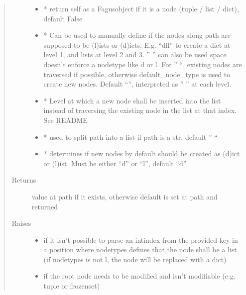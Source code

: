 \documentclass[a4paper,10pt,english]{sphinxmanual}
\begin{document}
\begin{fulllineitems}
\begin{fulllineitems}
\begin{quote}
\begin{description}
\begin{itemize}
\item {}
\sphinxAtStartPar
{} \textendash{} * return self as a Fagus\sphinxhyphen{}object if it is a node (tuple / list / dict), default False

\item {}
\sphinxAtStartPar
{} \textendash{} * Can be used to manually define if the nodes along path are supposed to be (l)ists or
(d)icts. E.g. “dll” to create a dict at level 1, and lists at level 2 and 3. ” ” can also be used \sphinxhyphen{}
space doesn’t enforce a node\sphinxhyphen{}type like d or l. For ” “, existing nodes are traversed if possible,
otherwise default\_node\_type is used to create new nodes. Default “”, interpreted as ” ” at each level.

\item {}
\sphinxAtStartPar
{} \textendash{} * Level at which a new node shall be inserted into the list instead of traversing the
existing node in the list at that index. See README

\item {}
\sphinxAtStartPar
{} \textendash{} * used to split path into a list if path is a str, default ” “

\item {}
\sphinxAtStartPar
{} \textendash{} * determines if new nodes by default should be created as (d)ict or (l)ist. Must be
either “d” or “l”, default “d”

\end{itemize}

\item[{Returns}] \leavevmode
\sphinxAtStartPar
value at path if it exists, otherwise default is set at path and returned

\item[{Raises}] \leavevmode\begin{itemize}
\item {}
\sphinxAtStartPar
{} \textendash{} if it isn’t possible to parse an int\sphinxhyphen{}index from the provided key in a position where node\sphinxhyphen{}types
    defines that the node shall be a list (if node\sphinxhyphen{}types is not l, the node will be replaced with a dict)

\item {}
\sphinxAtStartPar
{} \textendash{} if the root node needs to be modified and isn’t modifiable (e.g. tuple or frozenset)


\end{itemize}
\end{description}
\end{quote}
\end{fulllineitems}
\end{fulllineitems}
\end{document}
